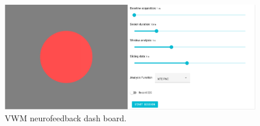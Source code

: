 \begin{figure}[H]
\begin{centering}
% 
\includegraphics[width=1\textwidth]{Appendix/databases/Figures/vwm-neurofeedback.png}
\par\end{centering}
\caption{\gls*{VWM} neurofeedback dash board.}
\label{}
\end{figure}